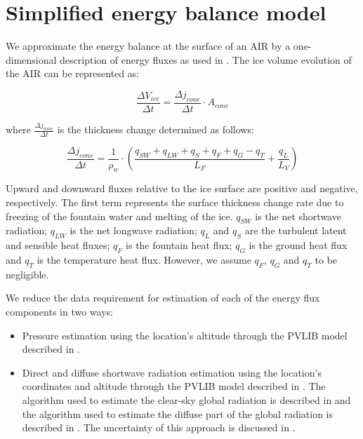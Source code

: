 \documentclass[tc, manuscript]{copernicus}
\begin{document}
\appendix

\section{Simplified energy balance model}

We approximate the energy balance at the surface of an AIR by a one-dimensional description of energy fluxes as
used in \cite{balasubramanianInfluenceMeteorologicalConditions2022}. The ice volume evolution of the AIR can be
represented as: 

\begin{equation}
  \frac{\Delta V_{ice}}{\Delta t}  =  \frac{\Delta j_{cone}}{ \Delta t} \cdot A_{cone}
	\label{eqn:freeze}
\end{equation}

where $\frac{\Delta j_{cone}}{\Delta t}$ is the thickness change determined as follows:

\begin{equation}
  \frac{\Delta j_{cone}}{\Delta t}  = \frac{1}{\rho_w} \cdot (\frac{q_{SW} + q_{LW} + q_{S} + q_{F} + q_{G} -
  q_{T}}{L_F} + \frac{q_{L}}{L_V} )
	\label{eqn:freeze}
\end{equation}

Upward and downward fluxes relative to the ice surface are positive and negative, respectively. The first term
represents the surface thickness change rate due to freezing of the fountain water and melting of the ice.
$q_{SW}$ is the net shortwave radiation; $q_{LW}$ is the net longwave radiation; $q_{L}$ and $q_{S}$ are the
turbulent latent and sensible heat fluxes; $q_{F}$ is the fountain heat flux; $q_{G}$ is the ground heat flux
and $q_{T}$ is the temperature heat flux. However, we assume $q_{F}$, $q_{G}$ and $q_{T}$ to be negligible.

We reduce the data requirement for estimation of each of the energy flux components in two ways:

\begin{itemize}
  \item Pressure estimation using the location's altitude through the PVLIB model described in
    \citet{holmgrenPvlibPythonPython2018}.
  \item Direct and diffuse shortwave radiation estimation using the location's coordinates and altitude through the
    PVLIB model described in \citet{holmgrenPvlibPythonPython2018}. The algorithm used to estimate the
    clear-sky global radiation is described in \citet{ineichenBroadbandSimplifiedVersion2008} and the algorithm
    used to estimate the diffuse part of the global radiation is described in
\citet{erbsEstimationDiffuseRadiation1982}. The uncertainty of this approach is discussed in
\cite{ineichenValidationModelsThat2016}. 
\end{itemize}
\end{document}
